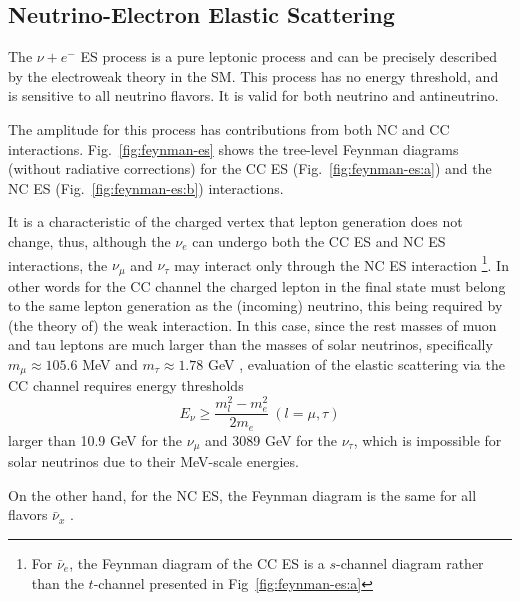 \subsection{Neutrino-Electron Elastic Scattering}\label{sect:NuEStheory}
The $\nu+e^-$ ES process is a pure leptonic process and can be precisely described by the electroweak theory in the SM. This process has no energy threshold, and is sensitive to all neutrino flavors. It is valid for both neutrino and antineutrino.

The amplitude for this process has contributions from both NC and CC interactions. Fig.~\ref{fig:feynman-es} shows the tree-level Feynman diagrams (without radiative corrections) for the CC ES (Fig.~\ref{fig:feynman-es:a}) and the NC ES (Fig.~\ref{fig:feynman-es:b}) interactions. 

It is a characteristic of the charged vertex that lepton generation does not change, thus, although the $\nu_e$ can undergo both the CC ES and NC ES interactions, the $\nu_{\mu}$ and $\nu_\tau$ may interact only through the NC ES interaction \footnote{For $\bar{\nu}_e$, the Feynman diagram of the CC ES is a $s$-channel diagram rather than the $t$-channel presented in Fig~\ref{fig:feynman-es:a}}. In other words for the CC channel the charged lepton in the final state must belong to the same lepton generation as the (incoming) neutrino, this being required by (the theory of) the weak interaction. In this case, since the rest masses of muon and tau leptons are much larger than the masses of solar neutrinos, specifically $m_\mu\approx 105.6$ MeV and $m_\tau\approx 1.78$ GeV \cite{pdg2020}, evaluation of the elastic scattering via the CC channel requires energy thresholds \cite{mcfarland2008neutrino}
\begin{equation*}
E_{\nu}\geq \frac{m^2_l-m_e^2}{2m_e}~(l=\mu,\tau)
\end{equation*}
larger than 10.9 GeV for the $\nu_\mu$ and 3089 GeV for the $\nu_\tau$, which is impossible for solar neutrinos due to their MeV-scale energies.

On the other hand, for the NC ES, the Feynman diagram is the same for all flavors $\bar{\nu}_x$ \cite{giunti2007fundamentals,xing2011neutrinos}. 

